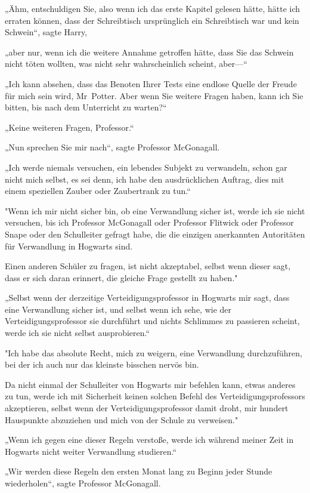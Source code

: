 {„Ähm, entschuldigen Sie, also wenn ich das erste Kapitel gelesen hätte, hätte ich erraten können, dass der Schreibtisch ursprünglich ein Schreibtisch war und kein Schwein“, sagte Harry,

„aber nur, wenn ich die weitere Annahme getroffen hätte, dass Sie das Schwein nicht töten wollten, was nicht sehr wahrscheinlich scheint, aber—“

„Ich kann absehen, dass das Benoten Ihrer Tests eine endlose Quelle der Freude für mich sein wird, Mr~Potter. Aber wenn Sie weitere Fragen haben, kann ich Sie bitten, bis nach dem Unterricht zu warten?“

„Keine weiteren Fragen, Professor.“

„Nun sprechen Sie mir nach“, sagte Professor McGonagall.

„Ich werde niemals versuchen, ein lebendes Subjekt zu verwandeln, schon gar nicht mich selbst, es sei denn, ich habe den ausdrücklichen Auftrag, dies mit einem speziellen Zauber oder Zaubertrank zu tun.“

"Wenn ich mir nicht sicher bin, ob eine Verwandlung sicher ist, werde ich sie nicht versuchen, bis ich Professor McGonagall oder Professor Flitwick oder Professor Snape oder den Schulleiter gefragt habe, die die einzigen anerkannten Autoritäten für Verwandlung in Hogwarts sind.

Einen anderen Schüler zu fragen, ist nicht akzeptabel, selbst wenn dieser sagt, dass er sich daran erinnert, die gleiche Frage gestellt zu haben."

„Selbst wenn der derzeitige Verteidigungsprofessor in Hogwarts mir sagt, dass eine Verwandlung sicher ist, und selbst wenn ich sehe, wie der Verteidigungsprofessor sie durchführt und nichts Schlimmes zu passieren scheint, werde ich sie nicht selbst ausprobieren.“

"Ich habe das absolute Recht, mich zu weigern, eine Verwandlung durchzuführen, bei der ich auch nur das kleinste bisschen nervös bin.

Da nicht einmal der Schulleiter von Hogwarts mir befehlen kann, etwas anderes zu tun, werde ich mit Sicherheit keinen solchen Befehl des Verteidigungsprofessors akzeptieren, selbst wenn der Verteidigungsprofessor damit droht, mir hundert Hauspunkte abzuziehen und mich von der Schule zu verweisen."

„Wenn ich gegen eine dieser Regeln verstoße, werde ich während meiner Zeit in Hogwarts nicht weiter Verwandlung studieren.“

„Wir werden diese Regeln den ersten Monat lang zu Beginn jeder Stunde wiederholen“, sagte Professor McGonagall.

}
